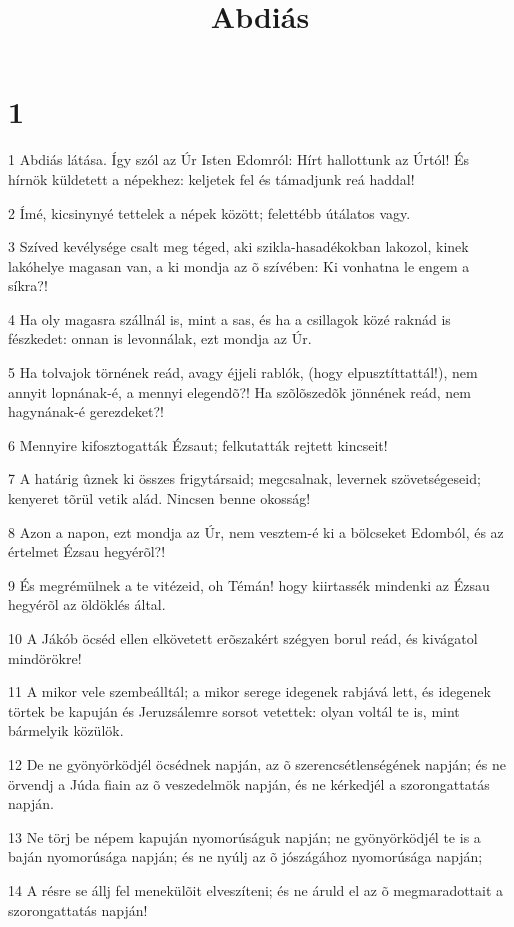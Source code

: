 

\title{Abdiás}


\chapter{1}

\par 1 Abdiás látása. Így szól az Úr Isten Edomról: Hírt hallottunk az Úrtól! És hírnök küldetett a népekhez: keljetek fel és támadjunk reá haddal!
\par 2 Ímé, kicsinynyé tettelek a népek között; felettébb útálatos vagy.
\par 3 Szíved kevélysége csalt meg téged, aki szikla-hasadékokban lakozol, kinek lakóhelye magasan van, a ki mondja az õ szívében: Ki vonhatna le engem a síkra?!
\par 4 Ha oly magasra szállnál is, mint a sas, és ha a csillagok közé raknád is fészkedet: onnan is levonnálak, ezt mondja az Úr.
\par 5 Ha tolvajok törnének reád, avagy éjjeli rablók, (hogy elpusztíttattál!), nem annyit lopnának-é, a mennyi elegendõ?! Ha szõlõszedõk jönnének reád, nem hagynának-é gerezdeket?!
\par 6 Mennyire kifosztogatták Ézsaut; felkutatták rejtett kincseit!
\par 7 A határig ûznek ki összes frigytársaid; megcsalnak, levernek szövetségeseid; kenyeret tõrül vetik alád. Nincsen benne okosság!
\par 8 Azon a napon, ezt mondja az Úr, nem vesztem-é ki a bölcseket Edomból, és az értelmet Ézsau hegyérõl?!
\par 9 És megrémülnek a te vitézeid, oh Témán! hogy kiirtassék mindenki az Ézsau hegyérõl az öldöklés által.
\par 10 A Jákób öcséd ellen elkövetett erõszakért szégyen borul reád, és kivágatol mindörökre!
\par 11 A mikor vele szembeálltál; a mikor serege idegenek rabjává lett, és idegenek törtek be kapuján és Jeruzsálemre sorsot vetettek: olyan voltál te is, mint bármelyik közülök.
\par 12 De ne gyönyörködjél öcsédnek napján, az õ szerencsétlenségének napján; és ne örvendj a Júda fiain az õ veszedelmök napján, és ne kérkedjél a szorongattatás napján.
\par 13 Ne törj be népem kapuján nyomorúságuk napján; ne gyönyörködjél te is a baján nyomorúsága napján; és ne nyúlj az õ jószágához nyomorúsága napján;
\par 14 A résre se állj fel menekülõit elveszíteni; és ne áruld el az õ megmaradottait a szorongattatás napján!
